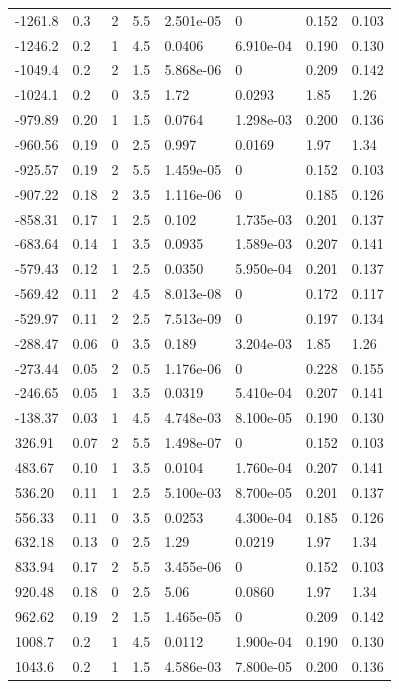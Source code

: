 \documentclass[preview]{standalone}
\begin{document}
{{\begin{tabular}{L{1.2cm}C{1.2cm} C{0.3cm}C{0.5cm} C{1.4cm}C{1.4cm} C{1.4cm}C{1.4cm}}
  -1261.8  &   0.3  & 2     & 5.5 &  2.501e-05  & 0  & 0.152 &  0.103   \\ 
  -1246.2  &   0.2  & 1     & 4.5 &  0.0406  & 6.910e-04  & 0.190 &  0.130   \\ 
  -1049.4  &   0.2  & 2     & 1.5 &  5.868e-06  & 0  & 0.209 &  0.142   \\ 
  -1024.1  &   0.2  & 0     & 3.5 &  1.72  & 0.0293  & 1.85 &  1.26   \\ 
  -979.89  &  0.20  & 1     & 1.5 &  0.0764  & 1.298e-03  & 0.200 &  0.136   \\ 
  -960.56  &  0.19  & 0     & 2.5 &  0.997  & 0.0169  & 1.97 &  1.34   \\ 
  -925.57  &  0.19  & 2     & 5.5 &  1.459e-05  & 0  & 0.152 &  0.103   \\ 
  -907.22  &  0.18  & 2     & 3.5 &  1.116e-06  & 0  & 0.185 &  0.126   \\ 
  -858.31  &  0.17  & 1     & 2.5 &  0.102  & 1.735e-03  & 0.201 &  0.137   \\ 
  -683.64  &  0.14  & 1     & 3.5 &  0.0935  & 1.589e-03  & 0.207 &  0.141   \\ 
  -579.43  &  0.12  & 1     & 2.5 &  0.0350  & 5.950e-04  & 0.201 &  0.137   \\ 
  -569.42  &  0.11  & 2     & 4.5 &  8.013e-08  & 0  & 0.172 &  0.117   \\ 
  -529.97  &  0.11  & 2     & 2.5 &  7.513e-09  & 0  & 0.197 &  0.134   \\ 
  -288.47  &  0.06  & 0     & 3.5 &  0.189  & 3.204e-03  & 1.85 &  1.26   \\ 
  -273.44  &  0.05  & 2     & 0.5 &  1.176e-06  & 0  & 0.228 &  0.155   \\ 
  -246.65  &  0.05  & 1     & 3.5 &  0.0319  & 5.410e-04  & 0.207 &  0.141   \\ 
  -138.37  &  0.03  & 1     & 4.5 &  4.748e-03  & 8.100e-05  & 0.190 &  0.130   \\ 
  326.91  &  0.07  & 2     & 5.5 &  1.498e-07  & 0  & 0.152 &  0.103   \\ 
  483.67  &  0.10  & 1     & 3.5 &  0.0104  & 1.760e-04  & 0.207 &  0.141   \\ 
  536.20  &  0.11  & 1     & 2.5 &  5.100e-03  & 8.700e-05  & 0.201 &  0.137   \\ 
  556.33  &  0.11  & 0     & 3.5 &  0.0253  & 4.300e-04  & 0.185 &  0.126   \\ 
  632.18  &  0.13  & 0     & 2.5 &  1.29  & 0.0219  & 1.97 &  1.34   \\ 
  833.94  &  0.17  & 2     & 5.5 &  3.455e-06  & 0  & 0.152 &  0.103   \\ 
  920.48  &  0.18  & 0     & 2.5 &  5.06  & 0.0860  & 1.97 &  1.34   \\ 
  962.62  &  0.19  & 2     & 1.5 &  1.465e-05  & 0  & 0.209 &  0.142   \\ 
  1008.7  &   0.2  & 1     & 4.5 &  0.0112  & 1.900e-04  & 0.190 &  0.130   \\ 
  1043.6  &   0.2  & 1     & 1.5 &  4.586e-03  & 7.800e-05  & 0.200 &  0.136   \\ 
\hline 
\end{tabular} 

}}
\end{document}
